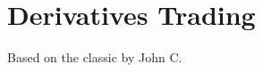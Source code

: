 \section{Derivatives Trading}

Based on the classic by John C. \cite{hull_2021}



\newpage



\newpage